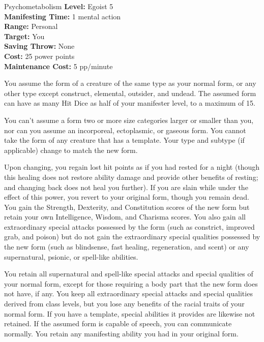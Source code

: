 {Psychometabolism}
{
	\textbf{Level:}
	Egoist 5\\
	\textbf{Manifesting Time:}
	1 mental action\\
	\textbf{Range:}
	Personal\\
	\textbf{Target:}
	You\\
	\textbf{Saving Throw:}
	None\\
	\textbf{Cost:}
	25 power points\\
	\textbf{Maintenance Cost:}
	5 pp/minute\\
}
{
	You assume the form of a creature of the same type as your normal form, or any other type except construct, elemental, outsider, and undead. The assumed form can have as many Hit Dice as half of your manifester level, to a maximum of 15.

	You can't assume a form two or more size categories larger or smaller than you, nor can you assume an incorporeal, ectoplasmic, or gaseous form. You cannot take the form of any creature that has a template. Your type and subtype (if applicable) change to match the new form.

	Upon changing, you regain lost hit points as if you had rested for a night (though this healing does not restore ability damage and provide other benefits of resting; and changing back does not heal you further). If you are slain while under the effect of this power, you revert to your original form, though you remain dead. You gain the Strength, Dexterity, and Constitution scores of the new form but retain your own Intelligence, Wisdom, and Charisma scores. You also gain all extraordinary special attacks possessed by the form (such as constrict, improved grab, and poison) but do not gain the extraordinary special qualities possessed by the new form (such as blindsense, fast healing, regeneration, and scent) or any supernatural, psionic, or spell-like abilities.

	You retain all supernatural and spell-like special attacks and special qualities of your normal form, except for those requiring a body part that the new form does not have, if any. You keep all extraordinary special attacks and special qualities derived from class levels, but you lose any benefits of the racial traits of your normal form. If you have a template, special abilities it provides are likewise not retained. If the assumed form is capable of speech, you can communicate normally. You retain any manifesting ability you had in your original form.

}
